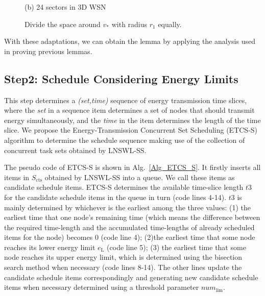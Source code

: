 \documentclass[journal,10pt]{IEEEtran}
\begin{document}
\begin{IEEEproof}
\begin{figure}[htb]
{\begin{minipage}[c]{0.22\textwidth}
\parbox{\linewidth}{\centering\small{(b) 24 sectors in 3D WSN}}
\end{minipage}
}
\caption{Divide the space around $v_{*}$ with radius $r_1$ equally.}
\label{fig_spacearound_div}
\end{figure}

With these adaptations, we can obtain the lemma by applying the analysis used in proving previous lemmas.
\end{IEEEproof}

\subsection{Step2: Schedule Considering Energy Limits}

This step determines a \textit{(set,time)} sequence of energy transmission time slices, where the \textit{set} in a sequence item determines a set of nodes that should transmit energy simultaneously, and the \textit{time} in the item determines the length of the time slice. We propose the Energy-Transmission Concurrent Set Scheduling (ETCS-S) algorithm to determine the schedule sequence making use of the collection of concurrent task sets obtained by LNSWL-SS.

The pseudo code of ETCS-S is shown in Alg.~\ref{Alg_ETCS_S}. It firstly inserts all items in $S_\text{cts}$ obtained by LNSWL-SS into a queue. We call these items as candidate schedule items. ETCS-S determines the available time-slice length $t3$ for the candidate schedule items in the queue in turn (code lines 4-14). $t3$ is mainly determined by whichever is the earliest among the three values: (1) the earliest time that one node's remaining time (which means the difference between the required time-length and the accumulated time-lengths of already scheduled items for the node) becomes 0 (code line 4); (2)the earliest time that some node reaches its lower energy limit $e_\text{L}$ (code line 5); (3) the earliest time that some node reaches its upper energy limit, which is determined using the bisection search method when necessary (code lines 8-14). The other lines update the candidate schedule items correspondingly and generating new candidate schedule items when necessary determined using a threshold parameter $num_\text{lim}$.
\end{document}
